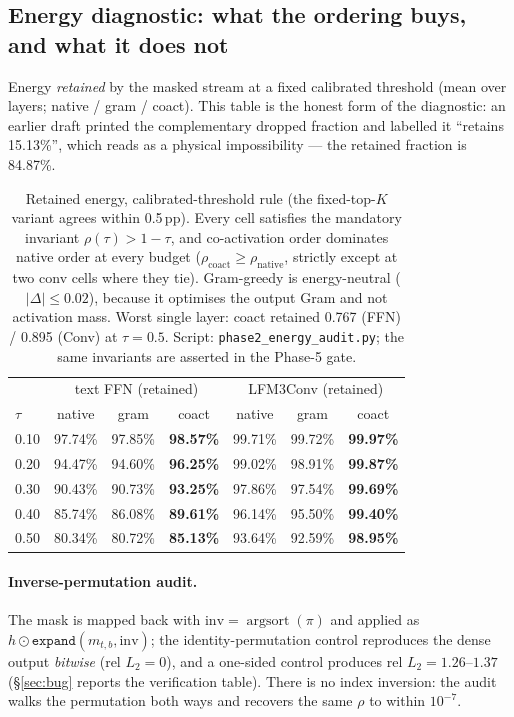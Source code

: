 \documentclass[11pt]{article}
\newcommand{\code}[1]{\texttt{\small #1}}
\begin{document}
\subsection{Energy diagnostic: what the ordering buys, and what it does not}
Energy \emph{retained} by the masked stream at a fixed calibrated threshold (mean over
layers; native / gram / coact). This table is the honest form of the diagnostic: an
earlier draft printed the complementary dropped fraction and labelled it ``retains
15.13\%'', which reads as a physical impossibility --- the retained fraction is 84.87\%.
\begin{table}[h]\centering\small
\begin{tabular}{lccc|ccc}
\toprule
 & \multicolumn{3}{c|}{text FFN (retained)} & \multicolumn{3}{c}{LFM3Conv (retained)} \\
$\tau$ & native & gram & coact & native & gram & coact \\
\midrule
0.10 & 97.74\% & 97.85\% & \textbf{98.57\%} & 99.71\% & 99.72\% & \textbf{99.97\%} \\
0.20 & 94.47\% & 94.60\% & \textbf{96.25\%} & 99.02\% & 98.91\% & \textbf{99.87\%} \\
0.30 & 90.43\% & 90.73\% & \textbf{93.25\%} & 97.86\% & 97.54\% & \textbf{99.69\%} \\
0.40 & 85.74\% & 86.08\% & \textbf{89.61\%} & 96.14\% & 95.50\% & \textbf{99.40\%} \\
0.50 & 80.34\% & 80.72\% & \textbf{85.13\%} & 93.64\% & 92.59\% & \textbf{98.95\%} \\
\bottomrule
\end{tabular}
\caption{Retained energy, calibrated-threshold rule (the fixed-top-$K$ variant agrees
within 0.5\,pp). Every cell satisfies the mandatory invariant $\rho(\tau)>1-\tau$, and
co-activation order dominates native order at every budget ($\rho_{\text{coact}}\ge
\rho_{\text{native}}$, strictly except at two conv cells where they tie). Gram-greedy is
energy-neutral ($|\Delta|\le0.02$), because it optimises the output Gram and not
activation mass. Worst single layer: coact retained 0.767 (FFN) / 0.895 (Conv) at
$\tau{=}0.5$. Script: \code{phase2\_energy\_audit.py}; the same invariants are asserted
in the Phase-5 gate.}
\end{table}
\paragraph{Inverse-permutation audit.} The mask is mapped back with
$\mathrm{inv}=\operatorname{argsort}(\pi)$ and applied as
$h\odot\texttt{expand}(m_{t,b},\mathrm{inv})$; the identity-permutation control reproduces
the dense output \emph{bitwise} (rel $L_2=0$), and a one-sided control produces rel
$L_2=1.26$--$1.37$ (\S\ref{sec:bug} reports the verification table). There is no index inversion: the audit walks
the permutation both ways and recovers the same $\rho$ to within $10^{-7}$.
\end{document}

